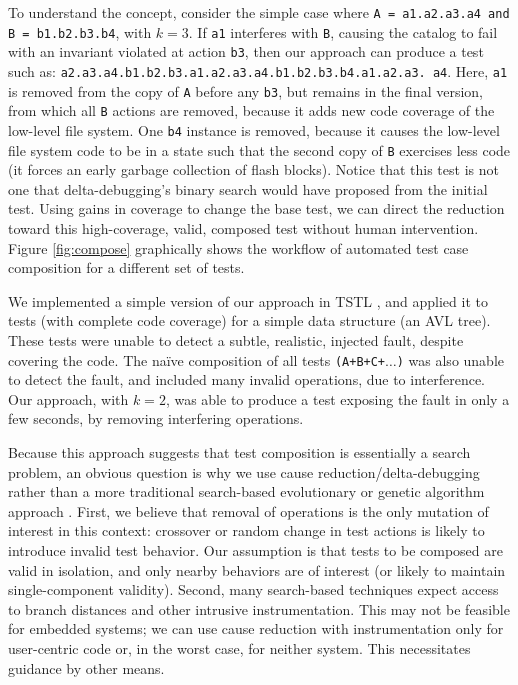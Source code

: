 To understand the concept, consider the simple case where {\tt A =
  a1.a2.a3.a4 and B = b1.b2.b3.b4}, with $k = 3$.  If {\tt a1}
interferes with {\tt B}, causing the catalog to fail with an invariant
violated at action {\tt b3}, then our approach can produce a test such
as: {\tt a2.a3.a4.b1.b2.b3.a1.a2.a3.a4.b1.b2.b3.b4.a1.a2.a3. a4}. Here,
{\tt a1} is removed from the copy of {\tt A} before any {\tt b3}, but
remains in the final version, from which all {\tt B} actions are
removed, because it adds new code coverage of the low-level file
system.  One {\tt b4} instance is removed, because it causes the
low-level file system code to be in a state such that the second copy
of {\tt B} exercises less code (it forces an early garbage collection
of flash blocks).  Notice that this test is not one that
delta-debugging's binary search would have proposed from the initial
test. Using gains in coverage to change the base test, we can direct
the reduction toward this high-coverage, valid, composed test without
human intervention.  Figure \ref{fig:compose} graphically shows the workflow of
automated test case composition for a different set of tests.

We implemented a simple version of our approach in TSTL \cite{tstlsttt}, and applied
it to tests (with complete code coverage) for a simple
data structure (an AVL tree).  These tests were unable to detect a
subtle, realistic, injected fault, despite covering the code. The
na\"ive composition of all tests {\tt (A+B+C+$\ldots$)} was also unable
to detect the fault, and included many invalid operations, due to
interference.  Our approach, with $k = 2$, was able to produce a test
exposing the fault in only a few seconds, by removing interfering
operations.

Because this approach suggests that test composition is essentially a
search problem, an obvious question is why we use cause
reduction/delta-debugging rather than a more traditional search-based
evolutionary or genetic algorithm approach \cite{searchtest,McMinn04search-basedsoftware,FA11}.  First, we believe that
removal of operations is the only mutation of interest in this
context: crossover or random change in test actions is likely to
introduce invalid test behavior.  Our assumption is that tests to be
composed are valid in isolation, and only nearby behaviors are of
interest (or likely to maintain single-component validity).  Second,
many search-based techniques expect access to branch distances and
other intrusive instrumentation.  This may not be feasible for
embedded systems; we can use cause reduction with instrumentation only
for user-centric code or, in the worst case, for neither system.  This
necessitates guidance by other means.

